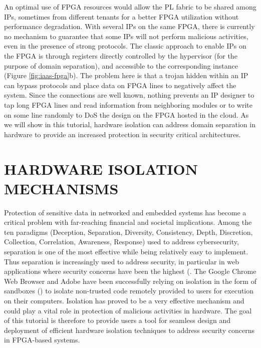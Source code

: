 \documentclass[sigconf]{acmart}
\theoremstyle{plain}
\theoremstyle{remark}
\begin{document}
An optimal use of FPGA resources would allow the PL fabric to be shared among IPs, sometimes from different tenants for a better FPGA utilization without performance degradation. With several IPs on the same FPGA, there is currently no mechanism to guarantee that some IPs will not perform malicious activities, even in the presence of strong protocols. The classic approach to enable IPs on the FPGA is through registers directly controlled by the hypervisor (for the purpose of domain separation), and accessible to the corresponding instance (Figure \ref{fig:iaas-fpga}b). The problem here is that a trojan hidden within an IP can bypass protocols and place data on FPGA lines to negatively affect the system. Since the connections are well known, nothing prevents an IP designer to tap long FPGA lines and read information from neighboring modules or to write on some line randomly to DoS the design on the FPGA hosted in the cloud. As we will show in this tutorial, hardware isolation can address domain separation in hardware to provide an increased protection in security critical architectures.

\section{HARDWARE ISOLATION MECHANISMS} \label{sec:problem_definition}

Protection of sensitive data in networked and embedded systems has become a critical problem with far-reaching financial and societal implications. Among the ten paradigms (Deception, Separation, Diversity,  Consistency, Depth, Discretion, Collection, Correlation, Awareness, Response) used to address cybersecurity, separation is one of the most effective while being relatively easy to implement. Thus separation is increasingly used to address security, in particular in web applications where security concerns have been the highest (\cite{Mello2015,  JonesCU, Fireglass2016, Cottrell2017}. The Google Chrome Web Browser and Adobe have been successfully relying on isolation in the form of sandboxes (\cite{chromiumSB, adobeSB}) to isolate non-trusted code remotely provided to users for execution on their computers. Isolation has proved to be a very effective mechanism and could play a vital role in protection of malicious activities in hardware. The goal of this tutorial is therefore to provide users a tool for seamless design and deployment of efficient hardware isolation techniques to address security concerns in FPGA-based systems.
\end{document}
